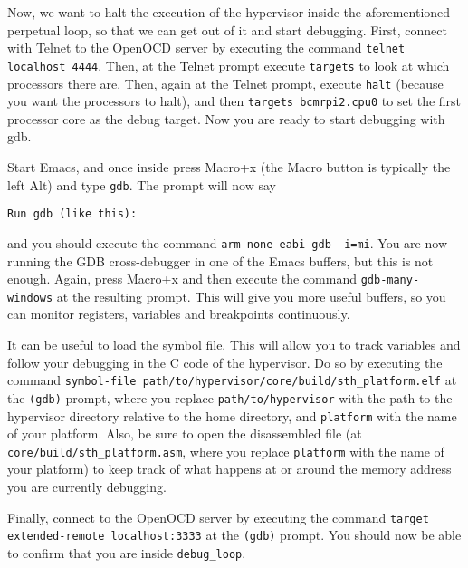 \documentclass[a4paper,11pt,reqno]{amsart}
\begin{document}
Now, we want to halt the execution of the hypervisor inside the aforementioned perpetual loop, so that we can get out of it and start debugging. First, connect with Telnet to the OpenOCD server by executing the command \texttt{telnet localhost 4444}. Then, at the Telnet prompt execute \texttt{targets} to look at which processors there are. Then, again at the Telnet prompt, execute \texttt{halt} (because you want the processors to halt), and then \texttt{targets bcmrpi2.cpu0} to set the first processor core as the debug target. Now you are ready to start debugging with gdb.

Start Emacs, and once inside press Macro+x (the Macro button is typically the left Alt) and type \texttt{gdb}. The prompt will now say

\begin{verbatim}
Run gdb (like this):
\end{verbatim}

and you should execute the command \texttt{arm-none-eabi-gdb -i=mi}. You are now running the GDB cross-debugger in one of the Emacs buffers, but this is not enough. Again, press Macro+x and then execute the command \texttt{gdb-many-windows} at the resulting prompt. This will give you more useful buffers, so you can monitor registers, variables and breakpoints continuously.

It can be useful to load the symbol file. This will allow you to track variables and follow your debugging in the C code of the hypervisor. Do so by executing the command \texttt{symbol-file path/to/hypervisor/core/build/sth_platform.elf} at the \texttt{(gdb)} prompt, where you replace \texttt{path/to/hypervisor} with the path to the hypervisor directory relative to the home directory, and \texttt{platform} with the name of your platform. Also, be sure to open the disassembled file (at \texttt{core/build/sth_platform.asm}, where you replace \texttt{platform} with the name of your platform) to keep track of what happens at or around the memory address you are currently debugging.

Finally, connect to the OpenOCD server by executing the command \texttt{target extended-remote localhost:3333} at the \texttt{(gdb)} prompt. You should now be able to confirm that you are inside \texttt{debug\_loop}. 
\end{document}
